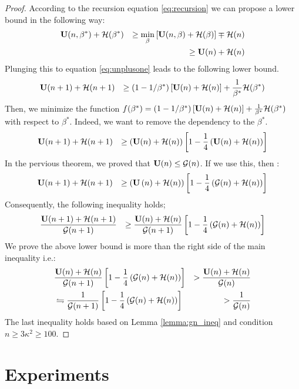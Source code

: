 \documentclass{article}
\begin{document}
\begin{proof}
According to the recursion equation \ref{eq:recursion} we can propose a lower
bound in the following way: 
\begin{eqnarray*}
	 & \mathbf U(n,\beta^*) + {\cal H}(\beta^*) & \geq \min_{\beta} \left[
	 \mathbf U(n,\beta) + {\cal H}(\beta) \right]\mp {\cal H}(n) \\ 
	 & & \geq \mathbf U(n) + {\cal H}(n)
\end{eqnarray*}
Plunging this to equation \ref{eq:unplusone} leads to the following lower bound.
\begin{eqnarray*}
	& \mathbf U(n+1) + {\cal H}(n+1) & \geq (1-1/\beta^*)\left[ \mathbf U(n) + {\cal H}(n)\right] +
	\frac{1}{\beta^*} {\cal H}(\beta^*) 
\end{eqnarray*}
Then, we minimize the function
$f(\beta^*) = (1-1/\beta^*)\left[ \mathbf U(n) + {\cal H}(n)\right] + \frac{1}{\beta^*} {\cal H}(\beta^*) $
with respect to $\beta^*$. Indeed, we want to remove the dependency to the
$\beta^*$.
\begin{eqnarray*}
	& \mathbf U(n+1) + {\cal H}(n+1) & \geq \left( \mathbf U(n) + {\cal H}(n)\right) \left[1 -
	\frac{1	}{4} \left( \mathbf U(n) + {\cal H}(n)\right)  \right]
\end{eqnarray*}
In the pervious theorem, we proved that $\mathbf U(n) \leq {\cal G}(n)$. If we use this,
then :
\begin{eqnarray*}
	& \mathbf U(n+1) + {\cal H}(n+1) & \geq \left( \mathbf U\left(n\right) + {\cal H}(n)\right)
	\left[1 - \frac{1	}{4} \left( {\cal G}(n) + {\cal H}(n)\right)  \right]
\end{eqnarray*}
Consequently, the following inequality holds; 
\begin{eqnarray*}
	& \frac{\mathbf U(n+1) + {\cal H}(n+1)}{{\cal G}(n+1)} & \geq \frac{ \mathbf U(n) +
	{\cal H}(n)}{{\cal G}(n+1)}
	\left[1 - \frac{1	}{4} \left( {\cal G}(n) + {\cal H}(n)\right)  \right]
\end{eqnarray*}
We prove the above lower bound is more than the right side of the main
inequality i.e.: 
\begin{eqnarray*}
	& \frac{ \mathbf U(n) +
	{\cal H}(n)}{{\cal G}(n+1)}
	\left[1 - \frac{1	}{4} \left( {\cal G}(n) + {\cal H}(n)\right)  \right] & >
	\frac{\mathbf U(n)+{\cal H}(n)}{{\cal G}(n)} \\ 
	& \leftrightharpoons \frac{1}{{\cal G}(n+1)}
	\left[1 - \frac{1	}{4} \left( {\cal G}(n) + {\cal H}(n)\right)  \right] & >
	\frac{1}{{\cal G}(n)}
\end{eqnarray*}
The last inequality holds based on Lemma \ref{lemma:gn_ineq} and condition
$n\geq 3 \kappa^2 \geq 100$.
\end{proof}
\section{Experiments}
\end{document}
